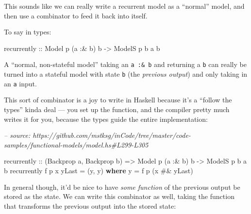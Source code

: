 \documentclass[]{article}
\newenvironment{Shaded}{}{}
\newcommand{\CommentTok}[1]{\textcolor[rgb]{0.38,0.63,0.69}{\textit{#1}}}
\newcommand{\DataTypeTok}[1]{\textcolor[rgb]{0.56,0.13,0.00}{#1}}
\newcommand{\FunctionTok}[1]{\textcolor[rgb]{0.02,0.16,0.49}{#1}}
\newcommand{\KeywordTok}[1]{\textcolor[rgb]{0.00,0.44,0.13}{\textbf{#1}}}
\newcommand{\NormalTok}[1]{#1}
\newcommand{\OtherTok}[1]{\textcolor[rgb]{0.00,0.44,0.13}{#1}}
\begin{document}
This sounds like we can really write a recurrent model as a ``normal'' model,
and then use a combinator to feed it back into itself.

To say in types:

\begin{Shaded}
\begin{Highlighting}[]
\NormalTok{recurrently}
\OtherTok{    ::} \DataTypeTok{Model}\NormalTok{  p   (a }\FunctionTok{:&}\NormalTok{ b) b}
    \OtherTok{->} \DataTypeTok{ModelS}\NormalTok{ p b  a       b}
\end{Highlighting}
\end{Shaded}

A ``normal, non-stateful model'' taking an \texttt{a\ :\&\ b} and returning a
\texttt{b} can really be turned into a stateful model with state \texttt{b} (the
\emph{previous output}) and only taking in an \texttt{a} input.

This sort of combinator is a joy to write in Haskell because it's a ``follow the
types'' kinda deal --- you set up the function, and the compiler pretty much
writes it for you, because the types guide the entire implementation:

\begin{Shaded}
\begin{Highlighting}[]
\CommentTok{-- source: https://github.com/mstksg/inCode/tree/master/code-samples/functional-models/model.hs#L299-L305}

\NormalTok{recurrently}
\OtherTok{    ::}\NormalTok{ (}\DataTypeTok{Backprop}\NormalTok{ a, }\DataTypeTok{Backprop}\NormalTok{ b)}
    \OtherTok{=>} \DataTypeTok{Model}\NormalTok{  p   (a }\FunctionTok{:&}\NormalTok{ b) b}
    \OtherTok{->} \DataTypeTok{ModelS}\NormalTok{ p b  a       b}
\NormalTok{recurrently f p x yLast }\FunctionTok{=}\NormalTok{ (y, y)}
  \KeywordTok{where}
\NormalTok{    y }\FunctionTok{=}\NormalTok{ f p (x }\FunctionTok{#&}\NormalTok{ yLast)}
\end{Highlighting}
\end{Shaded}

In general though, it'd be nice to have \emph{some function} of the previous
output be stored as the state. We can write this combinator as well, taking the
function that transforms the previous output into the stored state:
\end{document}
